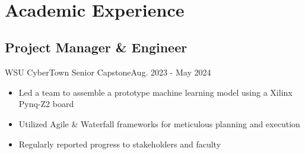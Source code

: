 \\ \section{Academic Experience}
\subsection{Project Manager \& Engineer}{WSU CyberTown Senior Capstone}{Aug. 2023 - May 2024}
\begin{itemize}
    \item Led a team to assemble a prototype machine learning model using a Xilinx Pynq-Z2 board
    \item Utilized Agile \& Waterfall frameworks for meticulous planning and execution
    \item Regularly reported progress to stakeholders and faculty
\end{itemize}
